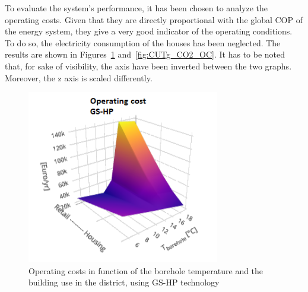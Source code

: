 \documentclass{article}
\begin{document}

To evaluate the system's performance, it has been chosen to analyze the operating costs. Given that they are directly proportional with the global COP of the energy system, they give a very good indicator of the operating conditions. To do so, the electricity consumption of the houses has been neglected. The results are shown in Figures~\ref{fig:CUTg_OC} and~\ref{fig:CUTg_CO2_OC}. It has to be noted that, for sake of visibility, the axis have been inverted between the two graphs. Moreover, the z axis is scaled differently.\\

\begin{figure}[htp]
	\centering
	\includegraphics[width=0.75\textwidth]{CUTg_SA_OC.png}
	\caption{Operating costs in function of the borehole temperature and the building use in the district, using GS-HP technology}
	\label{fig:CUTg_OC}
\end{figure}
\end{document}

